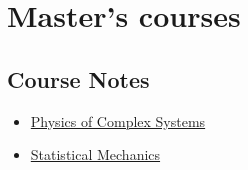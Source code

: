 \documentclass{article}
\begin{document}
\section{Master's courses}

\subsection{Course Notes}

    \begin{itemize}
        \item \href{source/m_physics_of_complex_systems.html}{Physics of Complex Systems}
        \item \href{source/m_statistical_mechanics.html}{Statistical Mechanics}
    \end{itemize}
\end{document}
